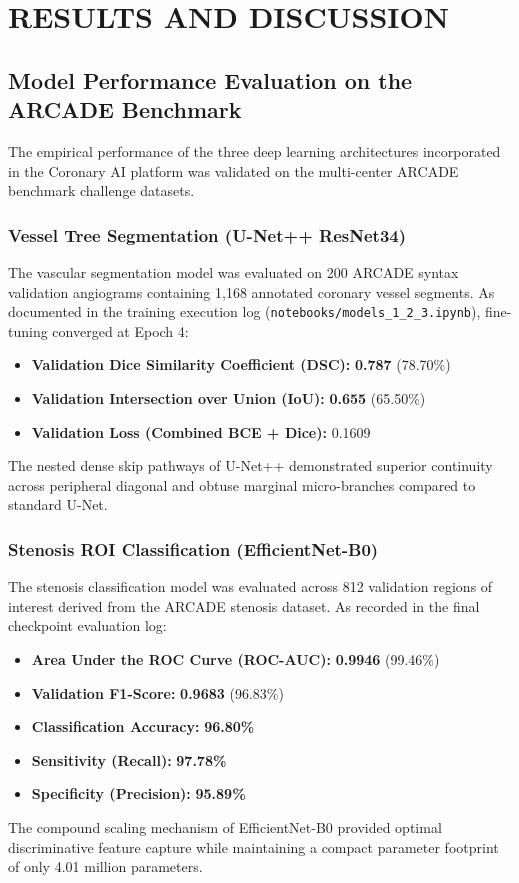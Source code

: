 \chapter{RESULTS AND DISCUSSION}

\section{Model Performance Evaluation on the ARCADE Benchmark}
The empirical performance of the three deep learning architectures incorporated in the Coronary AI platform was validated on the multi-center ARCADE benchmark challenge datasets.

\subsection{Vessel Tree Segmentation (U-Net++ ResNet34)}
The vascular segmentation model was evaluated on 200 ARCADE syntax validation angiograms containing 1,168 annotated coronary vessel segments. As documented in the training execution log (\texttt{notebooks/models\_1\_2\_3.ipynb}), fine-tuning converged at Epoch 4:
\begin{itemize}
    \item \textbf{Validation Dice Similarity Coefficient (DSC):} \textbf{0.787} (78.70\%)
    \item \textbf{Validation Intersection over Union (IoU):} \textbf{0.655} (65.50\%)
    \item \textbf{Validation Loss (Combined BCE + Dice):} 0.1609
\end{itemize}
The nested dense skip pathways of U-Net++ demonstrated superior continuity across peripheral diagonal and obtuse marginal micro-branches compared to standard U-Net.

\subsection{Stenosis ROI Classification (EfficientNet-B0)}
The stenosis classification model was evaluated across 812 validation regions of interest derived from the ARCADE stenosis dataset. As recorded in the final checkpoint evaluation log:
\begin{itemize}
    \item \textbf{Area Under the ROC Curve (ROC-AUC):} \textbf{0.9946} (99.46\%)
    \item \textbf{Validation F1-Score:} \textbf{0.9683} (96.83\%)
    \item \textbf{Classification Accuracy:} \textbf{96.80\%}
    \item \textbf{Sensitivity (Recall):} \textbf{97.78\%}
    \item \textbf{Specificity (Precision):} \textbf{95.89\%}
\end{itemize}
The compound scaling mechanism of EfficientNet-B0 provided optimal discriminative feature capture while maintaining a compact parameter footprint of only 4.01 million parameters.

